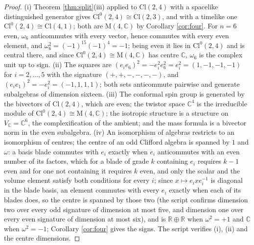 \documentclass[11pt]{article}
\theoremstyle{definition}
\newcommand{\Cl}{\mathrm{Cl}}
\newcommand{\R}{\mathbb{R}}
\newcommand{\C}{\mathbb{C}}
\newcommand{\Mat}{\mathrm{M}}
\begin{document}
\begin{proof}
(i) Theorem \ref{thm:split}(iii) applied to $\Cl(2,4)$ with a spacelike distinguished generator gives $\Cl^{0}(2,4) \cong \Cl(2,3)$, and with a timelike one $\Cl^{0}(2,4) \cong \Cl(4,1)$; both are $\Mat(4,\C)$ by Corollary \ref{cor:four}. For $n = 6$ even, $\omega_{6}$ anticommutes with every vector, hence commutes with every even element, and $\omega_{6}^{2} = (-1)^{15}(-1)^{4} = -1$; being even it lies in $\Cl^{0}(2,4)$ and is central there, and since $\Cl^{0}(2,4) \cong \Mat(4,\C)$ has centre $\C$, $\omega_{6}$ is the complex unit up to sign. (ii) The squares are $(e_{i}e_{6})^{2} = -e_{i}^{2}e_{6}^{2} = e_{i}^{2} = (1, -1, -1, -1)$ for $i = 2, \ldots, 5$ with the signature $(+,+,-,-,-,-)$, and $(e_{i}e_{1})^{2} = -e_{i}^{2} = (-1, 1, 1, 1)$; both sets anticommute pairwise and generate subalgebras of dimension sixteen. (iii) The conformal spin group is generated by the bivectors of $\Cl(2,4)$, which are even; the twistor space $\C^{4}$ is the irreducible module of $\Cl^{0}(2,4) \cong \Mat(4,\C)$; the isotropic structure is a structure on $V_{\C} = \C^{6}$, the complexification of the ambient; and the mass formula is a bivector norm in the even subalgebra. (iv) An isomorphism of algebras restricts to an isomorphism of centres; the centre of an odd Clifford algebra is spanned by $1$ and $\omega$: a basis blade commutes with $e_{i}$ exactly when $e_{i}$ anticommutes with an even number of its factors, which for a blade of grade $k$ containing $e_{i}$ requires $k - 1$ even and for one not containing it requires $k$ even, and only the scalar and the volume element satisfy both conditions for every $i$; since $x \mapsto e_{i}xe_{i}^{-1}$ is diagonal in the blade basis, an element commutes with every $e_{i}$ exactly when each of its blades does, so the centre is spanned by those two (the script confirms dimension two over every odd signature of dimension at most five, and dimension one over every even signature of dimension at most six), and is $\R \oplus \R$ when $\omega^{2} = +1$ and $\C$ when $\omega^{2} = -1$; Corollary \ref{cor:four} gives the signs. The script verifies (i), (ii) and the centre dimensions.
\end{proof}
\end{document}
